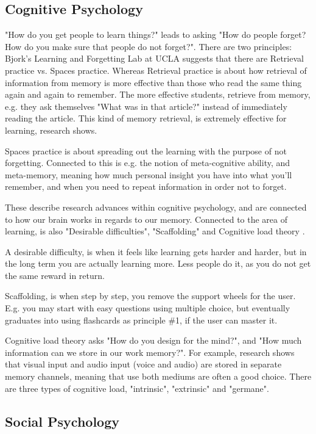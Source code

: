 \subsection{Cognitive Psychology}
"How do you get people to learn things?" leads to asking "How do people forget? How do you make sure that people do not forget?". There are two principles: Bjork's Learning and Forgetting Lab at UCLA suggests that there are Retrieval practice vs. Spaces practice. Whereas Retrieval practice is about how retrieval of information from memory is more effective than those who read the same thing again and again to remember. The more effective students, retrieve from memory, e.g. they ask themselves "What was in that article?" instead of immediately reading the article. This kind of memory retrieval, is extremely effective for learning, research shows.

Spaces practice is about spreading out the learning with the purpose of not forgetting. Connected to this is e.g. the notion of meta-cognitive ability, and meta-memory, meaning how much personal insight you have into what you'll remember, and when you need to repeat information in order not to forget.

These describe research advances within cognitive psychology, and are connected to how our brain works in regards to our memory. Connected to the area of learning, is also "Desirable difficulties", "Scaffolding" and Cognitive load theory .

A desirable difficulty, is when it feels like learning gets harder and harder, but in the long term you are actually learning more. Less people do it, as you do not get the same reward in return.

Scaffolding, is when step by step, you remove the support wheels for the user. E.g. you may start with easy questions using multiple choice, but eventually graduates into using flashcards as principle \#1, if the user can master it.

Cognitive load theory asks "How do you design for the mind?", and "How much information can we store in our work memory?". For example, research shows that visual input and audio input (voice and audio) are stored in separate memory channels, meaning that use both mediums are often a good choice. There are three types of cognitive load, "intrinsic", "extrinsic" and "germane".



\subsection{Social Psychology}

